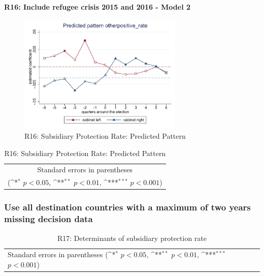 \documentclass[10pt,a4paper]{scrartcl}
\begin{document}
\clearpage
\textbf{R16: Include refugee crisis 2015 and 2016 - Model 2}
\begin{figure}[!ht]
	\centering
	\includegraphics[width=0.7\textwidth]{figures_edited/otherpositive_rate_graph2_R16.pdf}
	\caption{R16: Subsidiary Protection Rate: Predicted Pattern}
\end{figure}

\begin{table}[!ht]\centering
	\footnotesize
	\renewcommand{\arraystretch}{1.2}
	\def\sym#1{\ifmmode^{#1}\else\(^{#1}\)\fi}
	\caption{R16: Subsidiary Protection Rate: Predicted Pattern}
	\begin{tabular}{l*{2}{c}}
		\hline\hline
		
		\hline\hline
		\multicolumn{3}{c}{\footnotesize Standard errors in parentheses} \\
		\multicolumn{3}{c}{\footnotesize (\sym{*} \(p<0.05\), \sym{**} \(p<0.01\), \sym{***} \(p<0.001\))} \\
	\end{tabular}
\end{table}






\clearpage
\FloatBarrier
\subsubsection{Use all destination countries with a maximum of two years missing decision data}
\begin{table}[!ht]\centering
	\renewcommand{\arraystretch}{1.25}
	\small
	\def\sym#1{\ifmmode^{#1}\else\(^{#1}\)\fi}
	\caption{R17: Determinants of subsidiary protection rate}
	\begin{tabular}{l*{3}{c}}
		\hline\hline
		
		\hline\hline
		\multicolumn{4}{l}{\footnotesize Standard errors in parentheses (\sym{*} \(p<0.05\), \sym{**} \(p<0.01\), \sym{***} \(p<0.001\))}\\
	\end{tabular}
\end{table}
\end{document}
